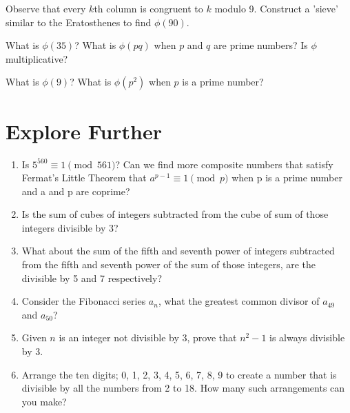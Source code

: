 \documentclass[a4paper,12pt]{article}
\begin{document}
Observe that every $k$th column is congruent to $k$ modulo 9. Construct a 'sieve' similar to the Eratosthenes to find $\phi(90)$.

What is $\phi(35)$? What is $\phi(pq)$ when $p$ and $q$ are prime numbers? Is $\phi$ multiplicative?

What is $\phi(9)$? What is $\phi(p^2)$ when $p$ is a prime number?
\newpage
\section*{Explore Further}
\begin{enumerate}
    \item Is $5^{560} \equiv 1 \pmod{561}$? Can we find more composite numbers that satisfy Fermat's Little Theorem that $a^{p-1} \equiv 1 \pmod{p}$ when p is a prime number and a and p are coprime?
    \item Is the sum of cubes of integers subtracted from the cube of sum of those integers divisible by 3?
    \item What about the sum of the fifth and seventh power of integers subtracted from the fifth and seventh power of the sum of those integers, are the divisible by 5 and 7 respectively?
    \item Consider the Fibonacci series $a_n$, what the greatest common divisor of $a_{49}$ and $a_{50}$?
    \item Given $n$ is an integer not divisible by 3, prove that $n^2-1$ is always divisible by 3.
    \item Arrange the ten digits; 0, 1, 2, 3, 4, 5, 6, 7, 8, 9 to create a number that is divisible by all the numbers from 2 to 18. How many such arrangements can you make?


\end{enumerate}
\end{document}
